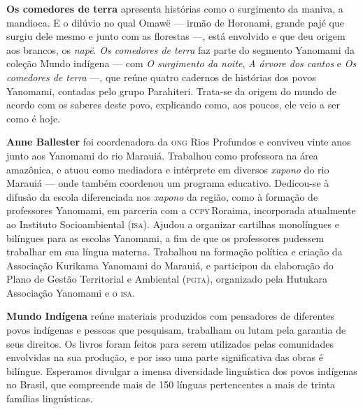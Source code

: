 \textbf{Os comedores de terra} apresenta histórias como o surgimento da maniva, a mandioca. E o dilúvio no qual Omawë --- irmão de Horonamɨ, grande pajé que surgiu dele mesmo e junto com as florestas ---, está envolvido e que deu origem aos brancos, os \textit{napë}. \textit{Os comedores de terra} faz parte do segmento Yanomami da coleção Mundo indígena --- com \textit{O surgimento da noite}, \textit{A árvore dos cantos} e \textit{Os comedores de terra} ---, que reúne quatro cadernos de histórias dos povos Yanomami, contadas pelo grupo Parahiteri. Trata-se da origem do mundo de acordo com os saberes deste povo, explicando como, aos poucos, ele veio a ser como é hoje.

\textbf{Anne Ballester} foi coordenadora da \textsc{ong} Rios Profundos e conviveu vinte anos junto aos Yanomami do rio Marauiá. Trabalhou como professora na área amazônica, e atuou como mediadora e intérprete em diversos \textit{xapono} do rio Marauiá --- onde também coordenou um programa educativo. Dedicou-se à difusão da escola diferenciada nos \textit{xapono} da região, como à formação de professores Yanomami, em parceria com a \textsc{ccpy}\,Roraima, incorporada atualmente ao Instituto Socioambiental (\textsc{isa}). Ajudou a organizar cartilhas monolíngues e bilíngues para as escolas Yanomami, a fim de que os professores pudessem trabalhar em sua língua materna. Trabalhou na formação política e criação da Associação Kurikama Yanomami do Marauiá, e participou da elaboração do Plano de Gestão Territorial e Ambiental (\textsc{pgta}), organizado pela Hutukara Associação Yanomami e o \textsc{isa}.

\textbf{Mundo Indígena} reúne materiais produzidos com pensadores de diferentes povos indígenas e pessoas que pesquisam, trabalham ou lutam pela garantia de seus direitos. Os livros foram feitos para serem utilizados pelas comunidades envolvidas na sua produção, e por isso uma parte significativa das obras é bilíngue. Esperamos divulgar a imensa diversidade linguística dos povos indígenas no Brasil, que compreende mais de 150 línguas pertencentes a mais de trinta famílias linguísticas.



